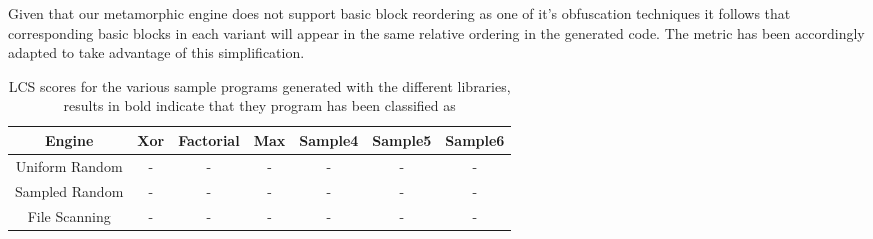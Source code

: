 \documentclass[finalcopy,short]{srpaper}
\begin{document}
        Given that our metamorphic engine does not support basic block
        reordering as one of it's obfuscation techniques it follows that
        corresponding basic blocks in each variant will appear in the same
        relative ordering in the generated code. The metric has been accordingly
        adapted to take advantage of this simplification.

        \begin{table}
            \centering
            \begin{tabular}{|c||c|c|c|c|c|c|}
                \hline
                Engine & Xor & Factorial & Max & Sample4 & Sample5 & Sample6 \\
                \hline
                Uniform Random & - & - & - & - & - & - \\
                \hline
                Sampled Random & - & - & - & - & - & - \\
                \hline
                File Scanning & - & - & - & - & - & - \\
                \hline
            \end{tabular}
            \caption{LCS scores for the various sample programs generated with
            the different libraries, results in bold indicate that they program
            has been classified as }
            \label{tab:results-different}
        \end{table}

     
\end{document}
